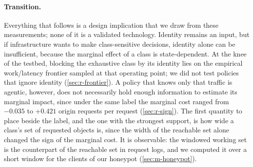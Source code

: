 \paragraph{Transition.}
Everything that follows is a design implication that we draw from these measurements;
none of it is a validated technology.
Identity remains an input, but if infrastructure wants to make class-sensitive decisions,
identity alone can be insufficient, because the marginal effect of a class is
state-dependent.
At the knee of the testbed, blocking the exhaustive class by its identity lies on the
empirical work/latency frontier sampled at that operating point; we did not test policies
that ignore identity (\cref{sec:r-frontier}).
A policy that knows only that traffic is agentic, however, does not necessarily hold enough
information to estimate its marginal impact,
since under the same label the marginal cost ranged from $-0.035$ to $+0.421$ origin
requests per request (\cref{sec:r-sign}).
The first quantity to place beside the label, and the one with the strongest support, is how
wide a class's set of requested objects is, since the width of the reachable set alone
changed the sign of the marginal cost.
It is observable: the windowed working set is the counterpart of the reachable set in
request logs, and we computed it over a short window for the clients of our honeypot
(\cref{sec:m-honeypot}).

